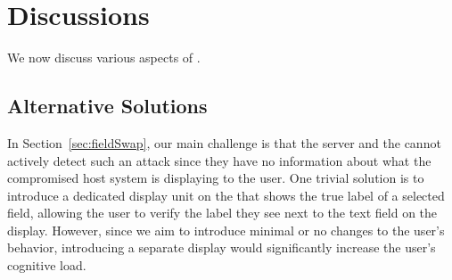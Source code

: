 \section{Discussions}
\label{sec:discussions}

We now discuss various aspects of \tool.

\subsection{Alternative Solutions}

In Section~\ref{sec:fieldSwap}, our main challenge is that the server and the \device cannot actively detect such an attack since they have no information about what the compromised host system is displaying to the user. One trivial solution is to introduce a dedicated display unit on the \device that shows the true label of a selected field, allowing the user to verify the label they see next to the text field on the display. However, since we aim to introduce minimal or no changes to the user's behavior, introducing a separate display would significantly increase the user's cognitive load.